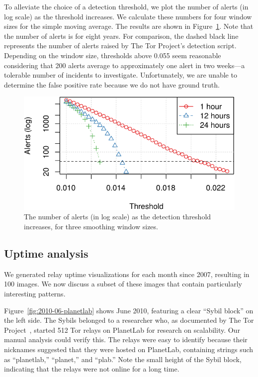To alleviate the choice of a detection threshold, we plot the number of alerts
(in log scale) as the threshold increases.  We calculate these numbers for four
window sizes for the simple moving average.  The results are shown in
Figure~\ref{fig:threshold-alarm}.  Note that the number of alerts is for eight
years.  For comparison, the dashed black line represents the number of alerts
raised by The Tor Project's detection script.  Depending on the window size,
thresholds above 0.055 seem reasonable considering that 200 alerts average to
approximately one alert in two weeks---a tolerable number of incidents to
investigate.  Unfortunately, we are unable to determine the false positive rate
because we do not have ground truth.

\begin{figure}[t]
	\centering
	\includegraphics[width=0.9\linewidth]{diagrams/threshold-alarm.pdf}
	\caption{The number of alerts (in log scale) as the detection threshold
	increases, for three smoothing window sizes.}
	\label{fig:threshold-alarm}
\end{figure}

\subsection{Uptime analysis}
\label{sec:uptime}
We generated relay uptime visualizations for each month since 2007, resulting in
100 images.  We now discuss a subset of these images that contain particularly
interesting patterns.

Figure~\ref{fig:2010-06-planetlab} shows June 2010, featuring a clear ``Sybil
block'' on the left side.  The Sybils belonged to a researcher who, as
documented by The Tor Project~\cite{progressreport}, started 512 Tor relays on
PlanetLab for research on scalability.  Our manual analysis could verify this.
The relays were easy to identify because their nicknames suggested that they
were hosted on PlanetLab, containing strings such as ``planetlab,'' ``planet,''
and ``plab.''  Note the small height of the Sybil block, indicating that the
relays were not online for a long time.


